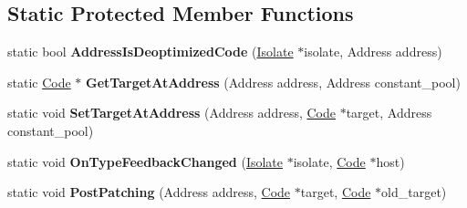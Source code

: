 \subsection*{Static Protected Member Functions}
\begin{DoxyCompactItemize}
\item 
static bool {\bfseries Address\+Is\+Deoptimized\+Code} (\hyperlink{classv8_1_1internal_1_1_isolate}{Isolate} $\ast$isolate, Address address)\hypertarget{classv8_1_1internal_1_1_i_c_a0fac2b886cc57408920e2ac9180a85cc}{}\label{classv8_1_1internal_1_1_i_c_a0fac2b886cc57408920e2ac9180a85cc}

\item 
static \hyperlink{classv8_1_1internal_1_1_code}{Code} $\ast$ {\bfseries Get\+Target\+At\+Address} (Address address, Address constant\+\_\+pool)\hypertarget{classv8_1_1internal_1_1_i_c_af2ecac92300caecbc5d0cc9d84aaffb4}{}\label{classv8_1_1internal_1_1_i_c_af2ecac92300caecbc5d0cc9d84aaffb4}

\item 
static void {\bfseries Set\+Target\+At\+Address} (Address address, \hyperlink{classv8_1_1internal_1_1_code}{Code} $\ast$target, Address constant\+\_\+pool)\hypertarget{classv8_1_1internal_1_1_i_c_ac018a7bdd33a7439779941f2bac18388}{}\label{classv8_1_1internal_1_1_i_c_ac018a7bdd33a7439779941f2bac18388}

\item 
static void {\bfseries On\+Type\+Feedback\+Changed} (\hyperlink{classv8_1_1internal_1_1_isolate}{Isolate} $\ast$isolate, \hyperlink{classv8_1_1internal_1_1_code}{Code} $\ast$host)\hypertarget{classv8_1_1internal_1_1_i_c_a360006f53a899823e68c385abe2f3c16}{}\label{classv8_1_1internal_1_1_i_c_a360006f53a899823e68c385abe2f3c16}

\item 
static void {\bfseries Post\+Patching} (Address address, \hyperlink{classv8_1_1internal_1_1_code}{Code} $\ast$target, \hyperlink{classv8_1_1internal_1_1_code}{Code} $\ast$old\+\_\+target)\hypertarget{classv8_1_1internal_1_1_i_c_a004c8aba9d7a441b923ec52cdc78c9a0}{}\label{classv8_1_1internal_1_1_i_c_a004c8aba9d7a441b923ec52cdc78c9a0}

\end{DoxyCompactItemize}
